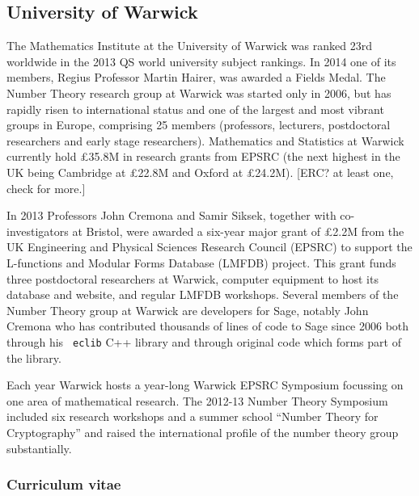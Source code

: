 \subsection*{University of Warwick}


The Mathematics Institute at the University of Warwick was ranked 23rd
worldwide in the 2013 QS world university subject rankings.  In 2014
one of its members, Regius Professor Martin Hairer, was awarded a
Fields Medal.  The Number Theory research group at Warwick was started
only in 2006, but has rapidly risen to international status and one of
the largest and most vibrant groups in Europe, comprising 25 members
(professors, lecturers, postdoctoral researchers and early stage
researchers).  Mathematics and Statistics at Warwick currently hold
£35.8M in research grants from EPSRC (the next highest in the UK being
Cambridge at £22.8M and Oxford at £24.2M).  [ERC?  at least one, check
  for more.]

In 2013 Professors John Cremona and Samir Siksek, together with
co-investigators at Bristol, were awarded a six-year major grant of
£2.2M from the UK Engineering and Physical Sciences Research Council
(EPSRC) to support the L-functions and Modular Forms Database (LMFDB)
project.  This grant funds three postdoctoral researchers at Warwick,
computer equipment to host its database and website, and regular LMFDB
workshops.  Several members of the Number Theory group at Warwick are
developers for Sage, notably John Cremona who has contributed
thousands of lines of code to Sage since 2006 both through his {\tt
  eclib} C++ library and through original \Python code which forms part
of the \Sage library.

Each year Warwick hosts a year-long Warwick EPSRC Symposium focussing
on one area of mathematical research.  The 2012-13 Number Theory
Symposium included six research workshops and a summer school ``Number
Theory for Cryptography'' and raised the international profile of the
number theory group substantially.


\subsubsection*{Curriculum vitae}


